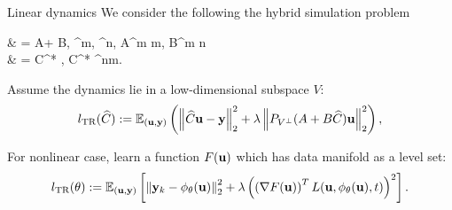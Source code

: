 \documentclass[aspectratio=169]{beamer}
\begin{document}

\begin{frame}{Linear dynamics}
	We consider the following the  hybrid simulation problem
	\bequn
		\begin{aligned}
			 & = A\mfu + B\mfy,  \quad \mfu\in\mbR^m, \mfy \in \mbR^n, A\in \mbR^{m \times m}, B\in \mbR^{m \times n}   \\
			\mfy & = C^* \mfu,  \quad C^* \in \mbR^{n\times m}.
		\end{aligned}
	\eequn

	Assume the dynamics lie in a low-dimensional subspace $V$:
	\begin{equation*}
		l_{\text{TR}}(\widehat C) := \mathbb{E}_{(\mathbf{u}, \mathbf{y})} \left( \left\| \widehat C \mathbf{u} - \mathbf{y} \right\|_2^2
		 + \lambda \left\| P_{V^{\perp}}(A + B\widehat C)\mathbf{u} \right\|_2^2 \right),
	\end{equation*}

	For nonlinear case, learn a function $F(\mathbf{u})$ which has data manifold as a level set:
	\begin{equation*}
	l_{\text{TR}}(\theta) := \mathbb{E}_{(\mathbf{u}, \mathbf{y})}\left[ \left\| \mathbf{y}_k - \phi_{\theta}(\mathbf{u}) \right\|_2^2
	+ \lambda \left(\left(  \nabla F(\mathbf{u}) \right)^T L(\mathbf{u}, \phi_{\theta}(\mathbf{u}), t)\right)^2 \right].
	\end{equation*}
\end{frame}
\end{document}
